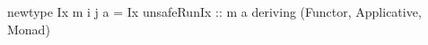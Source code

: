 \begin{code}
newtype Ix m i j a = Ix
  { unsafeRunIx :: m a
  }
  deriving (Functor, Applicative, Monad)
\end{code}

